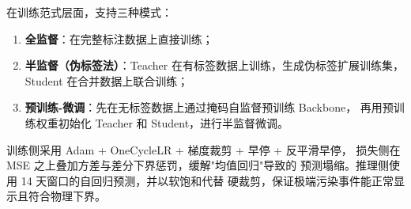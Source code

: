 \documentclass[11pt,a4paper]{article}
\begin{document}
在训练范式层面，支持三种模式：
\begin{enumerate}[leftmargin=*]
  \item \textbf{全监督}：在完整标注数据上直接训练；
  \item \textbf{半监督（伪标签法）}：Teacher 在有标签数据上训练，生成伪标签扩展训练集，
        Student 在合并数据上联合训练；
  \item \textbf{预训练-微调}：先在无标签数据上通过掩码自监督预训练 Backbone，
       再用预训练权重初始化 Teacher 和 Student，进行半监督微调。
\end{enumerate}

训练侧采用 Adam + OneCycleLR + 梯度裁剪 + 早停 + 反平滑早停，
损失侧在 MSE 之上叠加方差与差分下界惩罚，缓解"均值回归"导致的
预测塌缩。推理侧使用 14 天窗口的自回归预测，并以软饱和代替
硬裁剪，保证极端污染事件能正常显示且符合物理下界。

\appendix
\end{document}
